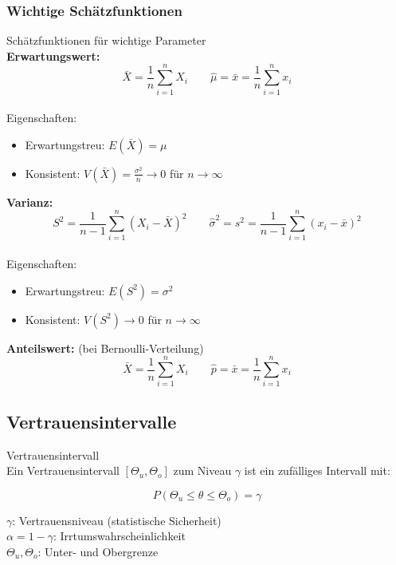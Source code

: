 \subsubsection{Wichtige Schätzfunktionen}
\begin{theorem}{Schätzfunktionen für wichtige Parameter}\\
\textbf{Erwartungswert:}
\vspace{-4mm}\\
\[\bar{X} = \frac{1}{n}\sum_{i=1}^n X_i \qquad \hat{\mu} = \bar{x} = \frac{1}{n}\sum_{i=1}^n x_i\]
\vspace{-4mm}\\
Eigenschaften:
\begin{itemize}
  \item Erwartungstreu: $E(\bar{X}) = \mu$
  \item Konsistent: $V(\bar{X}) = \frac{\sigma^2}{n} \to 0$ für $n \to \infty$
\end{itemize}
\vspace{1mm}
\textbf{Varianz:}
\vspace{-4mm}\\
\[S^2 = \frac{1}{n-1}\sum_{i=1}^n (X_i-\bar{X})^2 \qquad \hat{\sigma}^2 = s^2 = \frac{1}{n-1}\sum_{i=1}^n (x_i-\bar{x})^2\]
\vspace{-2mm}\\
Eigenschaften:
\begin{itemize}
  \item Erwartungstreu: $E(S^2) = \sigma^2$
  \item Konsistent: $V(S^2) \to 0$ für $n \to \infty$
\end{itemize}
\vspace{1mm}
\textbf{Anteilswert:} (bei Bernoulli-Verteilung)
\vspace{-2mm}\\
\[\bar{X} = \frac{1}{n}\sum_{i=1}^n X_i \qquad \hat{p} = \bar{x} = \frac{1}{n}\sum_{i=1}^n x_i\]
\end{theorem}

\subsection{Vertrauensintervalle}

\begin{definition}{Vertrauensintervall}\\
Ein Vertrauensintervall $[\Theta_u,\Theta_o]$ zum Niveau $\gamma$ ist ein zufälliges Intervall mit:

\[P(\Theta_u \leq \theta \leq \Theta_o) = \gamma\]

$\gamma$: Vertrauensniveau (statistische Sicherheit)\\
$\alpha = 1-\gamma$: Irrtumswahrscheinlichkeit\\
$\Theta_u, \Theta_o$: Unter- und Obergrenze
\end{definition}




